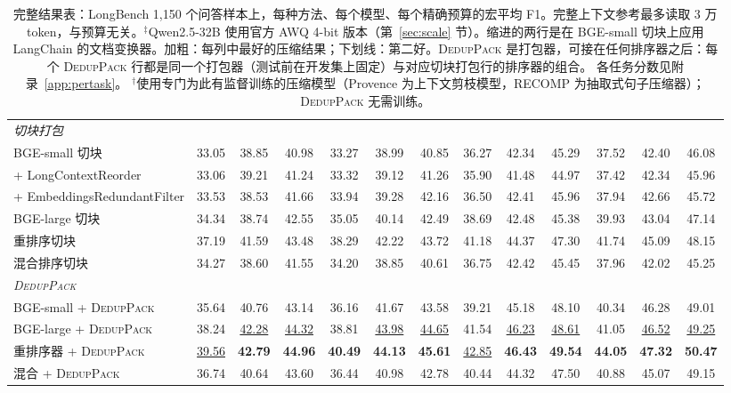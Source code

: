 \documentclass[11pt]{article}
\newcommand{\spk}{\textsc{DedupPack}}
\begin{document}
\begin{table}[t]
{\begin{tabular}{l ccc ccc ccc ccc}
\midrule
\multicolumn{13}{l}{\textit{切块打包}} \\
BGE-small 切块 & 33.05 & 38.85 & 40.98 & 33.27 & 38.99 & 40.85 & 36.27 & 42.34 & 45.29 & 37.52 & 42.40 & 46.08 \\
\quad + LongContextReorder & 33.06 & 39.21 & 41.24 & 33.32 & 39.12 & 41.26 & 35.90 & 41.48 & 44.97 & 37.42 & 42.34 & 45.96 \\
\quad + EmbeddingsRedundantFilter & 33.53 & 38.53 & 41.66 & 33.94 & 39.28 & 42.16 & 36.50 & 42.41 & 45.96 & 37.94 & 42.66 & 45.72 \\
BGE-large 切块 & 34.34 & 38.74 & 42.55 & 35.05 & 40.14 & 42.49 & 38.69 & 42.48 & 45.38 & 39.93 & 43.04 & 47.14 \\
重排序切块 & 37.19 & 41.59 & 43.48 & 38.29 & 42.22 & 43.72 & 41.18 & 44.37 & 47.30 & 41.74 & 45.09 & 48.15 \\
混合排序切块 & 34.27 & 38.60 & 41.55 & 34.20 & 38.85 & 40.61 & 36.75 & 42.42 & 45.45 & 37.96 & 42.02 & 45.25 \\
\midrule
\multicolumn{13}{l}{\textit{\spk{}}} \\
BGE-small + \spk{} & 35.64 & 40.76 & 43.14 & 36.16 & 41.67 & 43.58 & 39.21 & 45.18 & 48.10 & 40.34 & 46.28 & 49.01 \\
BGE-large + \spk{} & 38.24 & \underline{42.28} & \underline{44.32} & 38.81 & \underline{43.98} & \underline{44.65} & 41.54 & \underline{46.23} & \underline{48.61} & 41.05 & \underline{46.52} & \underline{49.25} \\
重排序器 + \spk{} & \underline{39.56} & \textbf{42.79} & \textbf{44.96} & \textbf{40.49} & \textbf{44.13} & \textbf{45.61} & \underline{42.85} & \textbf{46.43} & \textbf{49.54} & \textbf{44.05} & \textbf{47.32} & \textbf{50.47} \\
混合 + \spk{} & 36.74 & 40.64 & 43.60 & 36.44 & 40.98 & 42.78 & 40.44 & 44.32 & 47.50 & 40.88 & 45.07 & 49.15 \\
\bottomrule
\end{tabular}}
\caption{完整结果表：LongBench 1,150 个问答样本上，每种方法、每个模型、每个精确预算的宏平均 F1。完整上下文参考最多读取 3 万 token，与预算无关。$^\ddagger$Qwen2.5-32B 使用官方 AWQ 4-bit 版本（第~\ref{sec:scale} 节）。缩进的两行是在 BGE-small 切块上应用 LangChain 的文档变换器。加粗：每列中最好的压缩结果；下划线：第二好。\spk{} 是打包器，可接在任何排序器之后：每个 \spk{} 行都是同一个打包器（测试前在开发集上固定）与对应切块打包行的排序器的组合。 各任务分数见附录~\ref{app:pertask}。 $^\dagger$使用专门为此有监督训练的压缩模型（Provence 为上下文剪枝模型，RECOMP 为抽取式句子压缩器）；\spk{} 无需训练。}
\label{tab:main}
\end{table}
\end{document}
